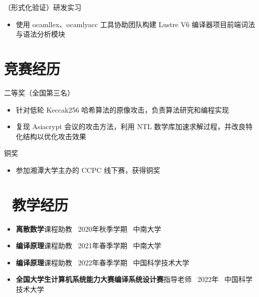 \documentclass{resume}
\begin{document}
{（形式化验证）研发实习}
\begin{itemize}
  \item 使用 ocamllex、ocamlyacc 工具协助团队构建 Lustre V6 编译器项目前端词法与语法分析模块
\end{itemize}


\section{\faCogs 竞赛经历}


{二等奖（全国第三名）}
\begin{itemize}
  \item 针对低轮 Keccak256 哈希算法的原像攻击，负责算法研究和编程实现
  \item 复现 Asiacrypt 会议的攻击方法，利用 NTL 数学库加速求解过程，并改良特化结构以优化攻击效果
\end{itemize}

{铜奖}
\begin{itemize}
  \item 参加湘潭大学主办的 CCPC 线下赛，获得铜奖
\end{itemize}


\section{\faBook\ 教学经历}
\begin{itemize}
  \item \textbf{离散数学}课程助教 \ 2020年秋季学期 \ 中南大学
  \item \textbf{编译原理}课程助教 \ 2021年春季学期 \ 中南大学
  \item \textbf{编译原理}课程助教 \ 2022年春季学期 \ 中国科学技术大学
  \item \textbf{全国大学生计算机系统能力大赛编译系统设计赛}指导老师 \ 2022年 \ 中国科学技术大学
\end{itemize}
\end{document}
